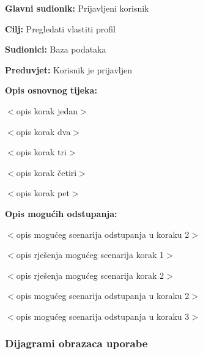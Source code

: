 \noindent {}
\begin{packed_item}

\item \textbf{Glavni sudionik:} Prijavljeni korisnik
\item  \textbf{Cilj:} Pregledati vlastiti profil
\item  \textbf{Sudionici:} Baza podataka
\item  \textbf{Preduvjet:} Korisnik je prijavljen
\item  \textbf{Opis osnovnog tijeka:}

\item[] \begin{packed_enum}

    \item $<$opis korak jedan$>$
    \item $<$opis korak dva$>$
    \item $<$opis korak tri$>$
    \item $<$opis korak četiri$>$
    \item $<$opis korak pet$>$

\end{packed_enum}

\item  \textbf{Opis mogućih odstupanja:}

\item[] \begin{packed_item}

    \item[2.a] $<$opis mogućeg scenarija odstupanja u koraku 2$>$
    \item[] \begin{packed_enum}

        \item $<$opis rješenja mogućeg scenarija korak 1$>$
        \item $<$opis rješenja mogućeg scenarija korak 2$>$

    \end{packed_enum}

\item[2.b] $<$opis mogućeg scenarija odstupanja u koraku 2$>$
\item[3.a] $<$opis mogućeg scenarija odstupanja  u koraku 3$>$

\end{packed_item}
\end{packed_item}

\subsubsection{Dijagrami obrazaca uporabe}

